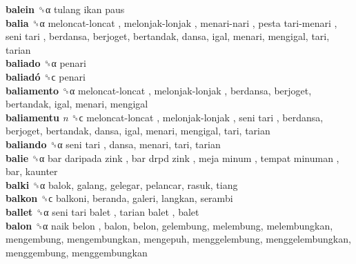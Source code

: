 \textbf{balein} ␝α   tulang ikan paus   \\
\textbf{balia} ␝α   meloncat-loncat ,  melonjak-lonjak ,  menari-nari ,  pesta tari-menari ,  seni tari , berdansa, berjoget, bertandak, dansa, igal, menari, mengigal, tari, tarian  \\
\textbf{baliado} ␝α  penari  \\
\textbf{baliadó} ␝ϲ  penari  \\
\textbf{baliamento} ␝α   meloncat-loncat ,  melonjak-lonjak , berdansa, berjoget, bertandak, igal, menari, mengigal  \\
\textbf{baliamentu} \emph{n}  ␝ϲ   meloncat-loncat ,  melonjak-lonjak ,  seni tari , berdansa, berjoget, bertandak, dansa, igal, menari, mengigal, tari, tarian  \\
\textbf{baliando} ␝α   seni tari , dansa, menari, tari, tarian  \\
\textbf{balie} ␝α   bar daripada zink ,  bar drpd zink ,  meja minum ,  tempat minuman , bar, kaunter  \\
\textbf{balki} ␝α  balok, galang, gelegar, pelancar, rasuk, tiang  \\
\textbf{balkon} ␝ϲ  balkoni, beranda, galeri, langkan, serambi  \\
\textbf{ballet} ␝α   seni tari balet ,  tarian balet , balet  \\
\textbf{balon} ␝α   naik belon , balon, belon, gelembung, melembung, melembungkan, mengembung, mengembungkan, mengepuh, menggelembung, menggelembungkan, menggembung, menggembungkan  \\
